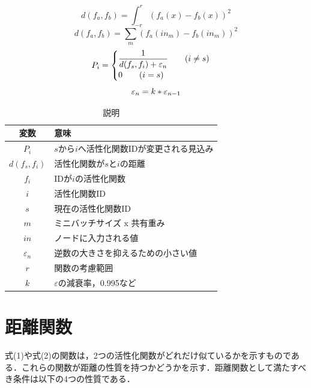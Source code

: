\documentclass[dvipdfmx]{jarticle}
\begin{document}
\begin{equation}
    d(f_{a}, f_{b}) = \int^{r}_{-r} (f_{a}(x) - f_{b}(x))^{2}
\end{equation}
\begin{equation}
    d(f_{a}, f_{b}) = \sum_{m}(f_{a}(in_{m}) - f_{b}(in_{m}))^2
\end{equation}
\begin{equation}
    P_{i} =  \begin{cases} \dfrac{1}{d(f_{s}, f_{i}) + \varepsilon_{n} } \qquad (i \neq s) \\ 0 \qquad (i = s) \end{cases}\\
\end{equation}
\begin{equation}
    \varepsilon_{n} = k * \varepsilon_{n-1} \\
\end{equation}

\begin{table}[h]
    \caption{説明}
    \centering
    \begin{tabular}{cl}
        \hline
        変数  & 意味 \\
        \hline \hline
        $P_{i}$               & $s$から$i$へ活性化関数IDが変更される見込み \\
        $d(f_{s}, f_{i})$     & 活性化関数が$s$と$i$の距離                 \\
        $f_{i}$               & IDが$i$の活性化関数                        \\
        $i$                   & 活性化関数ID                               \\
        $s$                   & 現在の活性化関数ID                         \\
        $m$                   & ミニバッチサイズ x 共有重み                \\
        $in$                  & ノードに入力される値                       \\
        $\varepsilon_{n}$        & 逆数の大きさを抑えるための小さい値         \\
        $r$                   & 関数の考慮範囲                             \\
        $k$                   & $\varepsilon$の減衰率，0.995など              \\
        \hline
    \end{tabular}
\end{table}

\section{距離関数}
式(1)や式(2)の関数は，2つの活性化関数がどれだけ似ているかを示すものである．これらの関数が距離の性質を持つかどうかを示す．距離関数として満たすべき条件は以下の4つの性質である．
\end{document}
